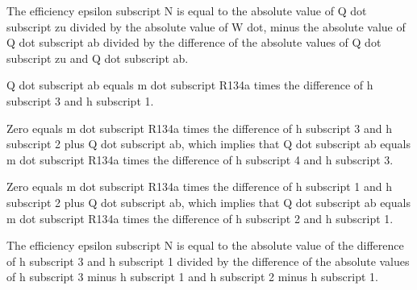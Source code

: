 The efficiency epsilon subscript N is equal to the absolute value of Q dot subscript zu divided by the absolute value of W dot, minus the absolute value of Q dot subscript ab divided by the difference of the absolute values of Q dot subscript zu and Q dot subscript ab.

Q dot subscript ab equals m dot subscript R134a times the difference of h subscript 3 and h subscript 1.

Zero equals m dot subscript R134a times the difference of h subscript 3 and h subscript 2 plus Q dot subscript ab, which implies that Q dot subscript ab equals m dot subscript R134a times the difference of h subscript 4 and h subscript 3.

Zero equals m dot subscript R134a times the difference of h subscript 1 and h subscript 2 plus Q dot subscript ab, which implies that Q dot subscript ab equals m dot subscript R134a times the difference of h subscript 2 and h subscript 1.

The efficiency epsilon subscript N is equal to the absolute value of the difference of h subscript 3 and h subscript 1 divided by the difference of the absolute values of h subscript 3 minus h subscript 1 and h subscript 2 minus h subscript 1.